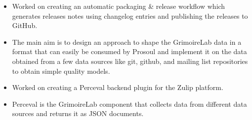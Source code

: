 \documentclass[10pt,a4paper]{style}
\begin{document}
\begin{itemize}
	\item Worked on creating an automatic packaging \& release workflow which generates releases notes using changelog entries and publishing the releases to GitHub.
\end{itemize}

%







\begin{itemize}
  \item The main aim is to design an approach to shape the GrimoireLab data in a format that can easily be consumed by Prosoul and implement it on the data obtained from a few data sources like git, github, and mailing list repositories to obtain simple quality models.
\end{itemize}

\divider

\begin{itemize}
  \item Worked on creating a Perceval backend plugin for the Zulip platform.
  \item Perceval is the GrimoireLab component that collects data from different data sources and returns it as JSON documents.
\end{itemize}
\end{document}
